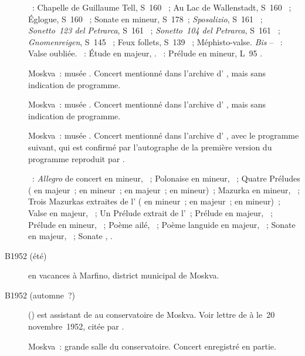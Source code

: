 \begin{description}
 \textsc{\Liszt{}}~: Chapelle de Guillaume Tell, S~160 ~; Au Lac
 de Wallenstadt, S~160 ~; Églogue, S~160 ~; Sonate en
 \kB mineur, S~178~; \emph{Sposalizio}, S~161 ~; \emph{Sonetto~123
 del Petrarca}, S~161 ~; \emph{Sonetto~104 del Petrarca}, S~161
 ~; \emph{Gnomenreigen}, S~145 ~; Feux follets, S~139
 ~; Méphisto-valse.
 \emph{Bis} -- \textsc{\Liszt{}}~: Valse oubliée.
 \textsc{\Chopin{}}~: Étude  en \kF majeur,  .
 \textsc{\Debussy{}}~: Prélude en \kA mineur, L~95 .
 \item[\DateWithWeekDay{1952-06-15}]
 Moskva~: musée \Scriabine{}.
 Concert mentionné dans l'archive d'\AVizel{} \citep[p.~174]{Nekrasova08},
 mais sans indication de programme.
 \item[\DateWithWeekDay{1952-06-18}]
 Moskva~: musée \Scriabine{}.
 Concert mentionné dans l'archive d'\AVizel{} \citep[p.~174]{Nekrasova08},
 mais sans indication de programme.
 \item[\DateWithWeekDay{1952-06-29}]
 Moskva~: musée \Scriabine{}.
 Concert mentionné dans l'archive d'\AVizel{} \citep[p.~174]{Nekrasova08},
 avec le programme suivant, qui est confirmé par l'autographe de la première
 version du programme reproduit par \citet{Milshteyn82a}.

 \textsc{\Scriabine{}}~: \emph{Allegro} de concert en \kB \Flat mineur,
 ~; Polonaise en \kB \Flat mineur, ~; Quatre Préludes
 (  en \kB majeur~;   en \kB \Flat
 mineur~;   en \kG \Flat majeur~;  
 en \kB mineur)~; Mazurka en \kG \Sharp mineur,  ~; Trois
 Mazurkas extraites de l' ( en \kE mineur~;  en
 \kB majeur~;  en \kF \Sharp mineur)~; Valse en \kA \Flat majeur,
 ~; Un Prélude extrait de l'~; Prélude en \kF \Sharp
 majeur,  ~; Prélude en \kE \Flat mineur, 
 ~; Poème ailé,  ~; Poème languide en \kB
 majeur,  ~; Sonate  en \kF \Sharp majeur,
 ~; Sonate , .
 \item[B1952 (été)]
 \VSofronitsky{} en vacances à Marfino, district municipal de Moskva.
 \item[B1952 (automne~?)]
 \DSerov{} () est assistant de \VSofronitsky{} au
 conservatoire de Moskva.
 Voir lettre de \Sofronitsky{} à \AVizel{} le~20 novembre~1952, citée par
 \citet[p.~174]{Nekrasova08}.
 \item[\DateWithWeekDay{1952-10-10}]
 Moskva~: grande salle du conservatoire.
 Concert enregistré en partie.


\end{description}
